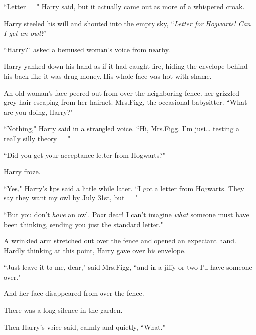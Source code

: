 ``Letter\===" Harry said, but it actually came out as more of a whispered croak.

Harry steeled his will and shouted into the empty sky, ``\emph{Letter for Hogwarts! Can I get an owl?}"

``Harry?" asked a bemused woman's voice from nearby.

Harry yanked down his hand as if it had caught fire, hiding the envelope behind his back like it was drug money. His whole face was hot with shame.

An old woman's face peered out from over the neighboring fence, her grizzled grey hair escaping from her hairnet. Mrs.\?Figg, the occasional babysitter. ``What are you doing, Harry?"

``Nothing," Harry said in a strangled voice. ``Hi, Mrs.\?Figg. I'm just{\ldots} testing a really silly theory\==="

``Did you get your acceptance letter from Hogwarts?"

Harry froze.

``Yes," Harry's lips said a little while later. ``I got a letter from Hogwarts. They say they want my owl by July 31st, but\==="

``But you don't \emph{have} an owl. Poor dear! I can't imagine \emph{what} someone must have been thinking, sending you just the standard letter."

A wrinkled arm stretched out over the fence and opened an expectant hand. Hardly thinking at this point, Harry gave over his envelope.

``Just leave it to me, dear," said Mrs.\?Figg, ``and in a jiffy or two I'll have someone over."

And her face disappeared from over the fence.

There was a long silence in the garden.

Then Harry's voice said, calmly and quietly, ``What."

